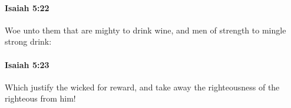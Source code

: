 		\paragraph{Isaiah 5:22} %
			\label{ISAIAH-5-22}

			Woe unto them that are mighty to drink wine, and men of strength to mingle strong drink:


		\paragraph{Isaiah 5:23} %
			\label{ISAIAH-5-23}

			Which justify the wicked for reward, and take away the righteousness of the righteous from him!


